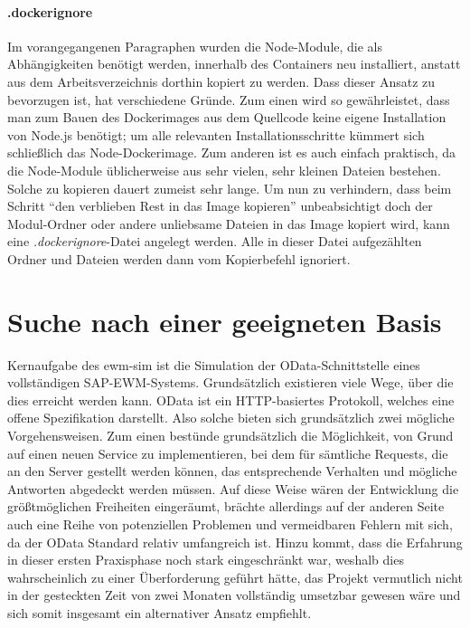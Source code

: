 \paragraph{.dockerignore}
Im vorangegangenen Paragraphen wurden die Node-Module, die als Abhängigkeiten benötigt werden, innerhalb des Containers neu installiert, anstatt aus dem Arbeitsverzeichnis dorthin kopiert zu werden.
Dass dieser Ansatz zu bevorzugen ist, hat verschiedene Gründe.
Zum einen wird so gewährleistet, dass man zum Bauen des Dockerimages aus dem Quellcode keine eigene Installation von Node.js benötigt; um alle relevanten Installationsschritte kümmert sich schließlich das Node-Dockerimage.
Zum anderen ist es auch einfach praktisch, da die Node-Module üblicherweise aus sehr vielen, sehr kleinen Dateien bestehen.
Solche zu kopieren dauert zumeist sehr lange.
Um nun zu verhindern, dass beim Schritt \enquote{den verblieben Rest in das Image kopieren} unbeabsichtigt doch der Modul-Ordner oder andere unliebsame Dateien in das Image kopiert wird, kann eine \emph{.dockerignore}-Datei angelegt werden.
Alle in dieser Datei aufgezählten Ordner und Dateien werden dann vom Kopierbefehl ignoriert.



\section{Suche nach einer geeigneten Basis}
Kernaufgabe des \ac{ewm-sim} ist die Simulation der OData-Schnittstelle eines vollständigen SAP-EWM-Systems.
Grundsätzlich existieren viele Wege, über die dies erreicht werden kann.
OData ist ein HTTP-basiertes Protokoll, welches eine offene Spezifikation darstellt.
Also solche bieten sich grundsätzlich zwei mögliche Vorgehensweisen.
Zum einen bestünde grundsätzlich die Möglichkeit, von Grund auf einen neuen Service zu implementieren, bei dem für sämtliche Requests, die an den Server gestellt werden können, das entsprechende Verhalten und mögliche Antworten abgedeckt werden müssen.
Auf diese Weise wären der Entwicklung die größtmöglichen Freiheiten eingeräumt, brächte allerdings auf der anderen Seite auch eine Reihe von potenziellen Problemen und vermeidbaren Fehlern mit sich, da der OData Standard relativ umfangreich ist.
Hinzu kommt, dass die Erfahrung in dieser ersten Praxisphase noch stark eingeschränkt war, weshalb dies wahrscheinlich zu einer Überforderung geführt hätte, das Projekt vermutlich nicht in der gesteckten Zeit von zwei Monaten vollständig umsetzbar gewesen wäre und sich somit insgesamt ein alternativer Ansatz empfiehlt.

